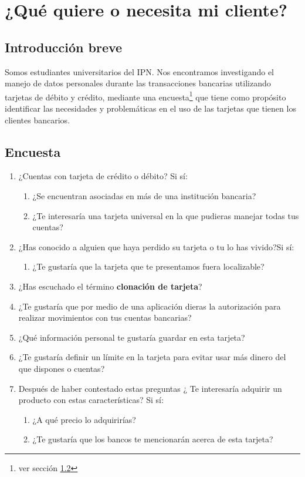 \documentclass[11pt]{book}
\begin{document}
\chapter{¿Qué quiere o necesita mi cliente?}

\section{Introducción breve}

Somos estudiantes universitarios del IPN. Nos encontramos investigando el manejo de datos personales durante las transacciones bancarias utilizando tarjetas de débito y crédito, mediante una encuesta\footnote{ver sección \ref{sec:Encuesta}} que tiene como propósito identificar las necesidades y problemáticas en el uso de las tarjetas que tienen los clientes bancarios.

\section{Encuesta}
\label{sec:Encuesta}
\begin{enumerate}
	\item ¿Cuentas con tarjeta de crédito o débito? Si sí:
		\begin{enumerate}
			\item ¿Se encuentran asociadas en más de una institución bancaria?
			\item ¿Te interesaría una tarjeta universal en la que pudieras manejar todas
			tus cuentas?
		\end{enumerate}
	\item ¿Has conocido a alguien que haya perdido su tarjeta o tu lo has vivido?Si sí:
		\begin{enumerate}
			\item ¿Te gustaría que la tarjeta que te presentamos fuera localizable?
		\end{enumerate}
	\item ¿Has escuchado el término \textbf{clonación de tarjeta}?
		
	\item ¿Te gustaría que por medio de una aplicación dieras la autorización para realizar movimientos con tus cuentas bancarias?
	
	\item ¿Qué información personal te gustaría guardar en esta tarjeta?
	
	\item ¿Te gustaría definir un límite en la tarjeta para evitar usar más dinero del que dispones o cuentas?
	
	\item Después de haber contestado estas preguntas ¿ Te interesaría adquirir un producto con estas características? Si sí:
		\begin{enumerate}
			\item ¿A qué precio lo adquirirías?
			\item ¿Te gustaría que los bancos te mencionarán acerca de esta tarjeta?
		\end{enumerate}
\end{enumerate}




	
	
	
\end{document}
